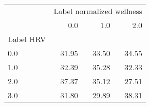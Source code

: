 \begin{tabular}{lrrr}
\toprule
{} & \multicolumn{3}{l}{Label normalized wellness} \\
{} &                       0.0 &    1.0 &    2.0 \\
Label HRV &                           &        &        \\
\midrule
0.0       &                     31.95 &  33.50 &  34.55 \\
1.0       &                     32.39 &  35.28 &  32.33 \\
2.0       &                     37.37 &  35.12 &  27.51 \\
3.0       &                     31.80 &  29.89 &  38.31 \\
\bottomrule
\end{tabular}
